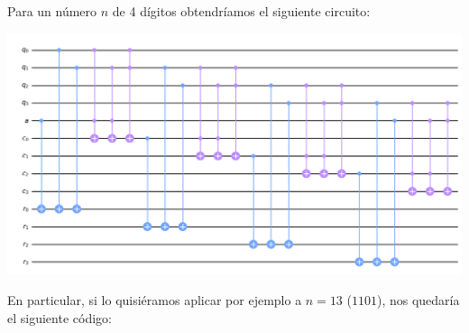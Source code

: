 Para un número $n$ de 4 dígitos obtendríamos el siguiente circuito:


\begin{center}
    \centering
    \includegraphics[width=1\linewidth]{Imagenes/CircuitoTSinCompactar.png}
    \label{fig:CircuitoTSinCompactar}
\end{center}

En particular, si lo quisiéramos aplicar por ejemplo a $n=13$ ($1101$), nos quedaría el siguiente código:

